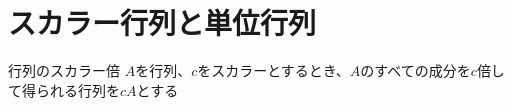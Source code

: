 \documentclass[../../../topic_linear-algebra]{subfiles}
\begin{document}
\sectionline
\section{スカラー行列と単位行列}

\begin{mindflow}
\end{mindflow}

\begin{definition*}{行列のスカラー倍}
  $A$を行列、$c$をスカラーとするとき、$A$のすべての成分を$c$倍して得られる行列を$cA$とする
\end{definition*}
\end{document}

